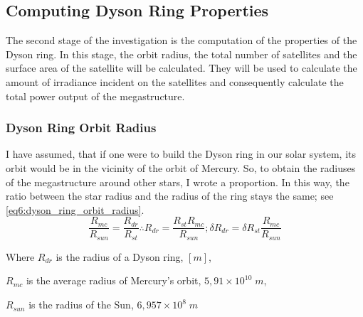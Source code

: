 \documentclass[stu, 11pt, a4paper, floatsintext, noextraspace]{apa7}
\begin{document}
	\subsection{Computing Dyson Ring Properties}
	The second stage of the investigation is the computation of the properties of the Dyson ring. In this stage, the orbit radius, the total number of satellites and the surface area of the satellite will be calculated. They will be used to calculate the amount of irradiance incident on the satellites and consequently calculate the total power output of the megastructure.
	\subsubsection{Dyson Ring Orbit Radius}
	I have assumed, that if one were to build the Dyson ring in our solar system, its orbit would be in the vicinity of the orbit of Mercury. So, to obtain the radiuses of the megastructure around other stars, I wrote a proportion. In this way, the ratio between the star radius and the radius of the ring stays the same; see \cref{eq6:dyson_ring_orbit_radius}.
	\begin{equation}
		\label{eq6:dyson_ring_orbit_radius}
		\frac{R_{mc}}{R_{sun}}=\frac{R_{dr}}{R_{st}} \therefore R_{dr}=\frac{R_{st}R_{mc}}{R_{sun}}; \delta R_{dr}=\delta R_{st}\frac{R_{mc}}{R_{sun}}
	\end{equation}
	\begin{center}
		Where $R_{dr}$ is the radius of a Dyson ring, $[m]$,
		
		$R_{mc}$ is the average radius of Mercury's orbit, $5,91\times10^{10}\;m$,
		
 		$R_{sun}$ is the radius of the Sun, $6,957\times10^8\;m$
	\end{center}
\end{document}
